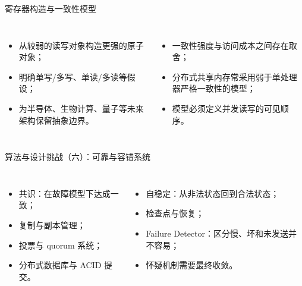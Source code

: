 \documentclass[UTF8,fontset=none,aspectratio=169,10pt]{beamer}
\begin{document}
\begin{frame}{寄存器构造与一致性模型}
\begin{columns}[T,onlytextwidth]
\begin{itemize}
  \item 从较弱的读写对象构造更强的原子对象；
  \item 明确单写/多写、单读/多读等假设；
  \item 为半导体、生物计算、量子等未来架构保留抽象边界。
\end{itemize}
\begin{itemize}
  \item 一致性强度与访问成本之间存在取舍；
  \item 分布式共享内存常采用弱于单处理器严格一致性的模型；
  \item 模型必须定义并发读写的可见顺序。
\end{itemize}
\end{columns}
\vfill
{}
\end{frame}

\begin{frame}{算法与设计挑战（六）：可靠与容错系统}
\begin{columns}[T,onlytextwidth]
\begin{itemize}\item 共识：在故障模型下达成一致；\item 复制与副本管理；\item 投票与 quorum 系统；\item 分布式数据库与 ACID 提交。\end{itemize}
\begin{itemize}\item 自稳定：从非法状态回到合法状态；\item 检查点与恢复；\item Failure Detector：区分慢、坏和未发送并不容易；\item 怀疑机制需要最终收敛。\end{itemize}\end{columns}
\vfill{}
\end{frame}
\end{document}
